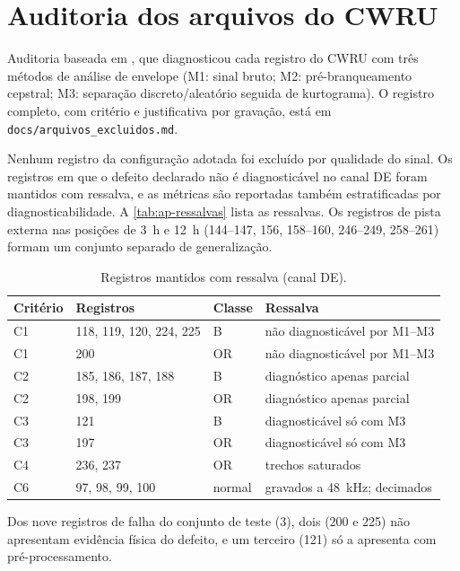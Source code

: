 \chapter{Auditoria dos arquivos do CWRU}
\label{ap:arquivos-excluidos}

Auditoria baseada em \textcite{smith2015}, que diagnosticou cada registro do CWRU
com três métodos de análise de envelope (M1: sinal bruto; M2: pré-branqueamento
cepstral; M3: separação discreto/aleatório seguida de kurtograma). O registro
completo, com critério e justificativa por gravação, está em
\texttt{docs/arquivos\_excluidos.md}.

Nenhum registro da configuração adotada foi excluído por qualidade do sinal. Os
registros em que o defeito declarado não é diagnosticável no canal DE foram
mantidos com ressalva, e as métricas são reportadas também estratificadas por
diagnosticabilidade. A \autoref{tab:ap-ressalvas} lista as ressalvas. Os
registros de pista externa nas posições de 3~h e 12~h (144--147, 156, 158--160,
246--249, 258--261) formam um conjunto separado de generalização.

\begin{table}[htb]
  \centering
  \small
  \caption{Registros mantidos com ressalva (canal DE).}
  \label{tab:ap-ressalvas}
  \begin{tabular}{llll}
    \toprule
    \textbf{Critério} & \textbf{Registros} & \textbf{Classe} & \textbf{Ressalva} \\
    \midrule
    C1 & 118, 119, 120, 224, 225 & B   & não diagnosticável por M1--M3 \\
    C1 & 200                     & OR  & não diagnosticável por M1--M3 \\
    C2 & 185, 186, 187, 188      & B   & diagnóstico apenas parcial \\
    C2 & 198, 199                & OR  & diagnóstico apenas parcial \\
    C3 & 121                     & B   & diagnosticável só com M3 \\
    C3 & 197                     & OR  & diagnosticável só com M3 \\
    C4 & 236, 237                & OR  & trechos saturados \\
    C6 & 97, 98, 99, 100         & normal & gravados a \SI{48}{\kilo\hertz}; decimados \\
    \bottomrule
  \end{tabular}
\end{table}

Dos nove registros de falha do conjunto de teste (\SI{3}{\hp}), dois (200 e 225)
não apresentam evidência física do defeito, e um terceiro (121) só a apresenta com
pré-processamento.
